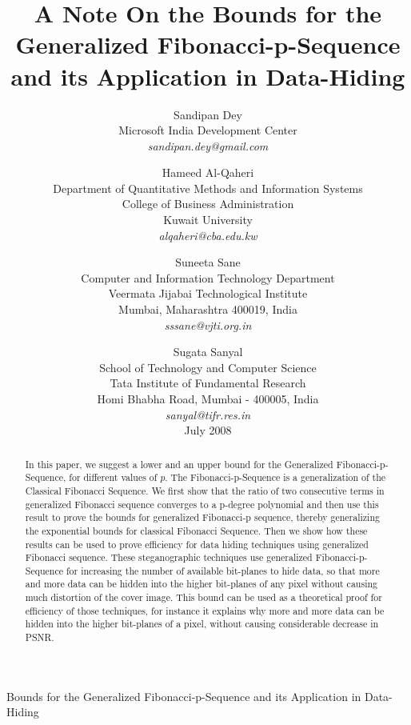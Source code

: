 \documentclass{ijcsa}
\begin{document}
\catchline{}{}{}{}{}

{Bounds for the Generalized Fibonacci-p-Sequence and its Application in Data-Hiding}

\title{A Note On the Bounds for the Generalized Fibonacci-p-Sequence and its Application in Data-Hiding}

\author{Sandipan Dey
\\Microsoft India Development Center
\\\emph{sandipan.dey@gmail.com}
}
\author{Hameed Al-Qaheri
\\Department of Quantitative Methods and Information Systems
\\College of Business Administration
\\Kuwait University
\\\emph{alqaheri@cba.edu.kw}
}
\author{Suneeta Sane
\\Computer and Information Technology Department
\\Veermata Jijabai Technological Institute
\\Mumbai, Maharashtra 400019, India
\\\emph{sssane@vjti.org.in}
}
\author{Sugata Sanyal
\\School of Technology and Computer Science
\\Tata Institute of Fundamental Research
\\Homi Bhabha Road, Mumbai - 400005, India
\\\emph{sanyal@tifr.res.in}
\\July 2008
}

\date{}

\maketitle

\begin{abstract}
\par In this paper, we suggest a lower and an upper bound for the Generalized Fibonacci-p-Sequence, 
for different values of $p$. The Fibonacci-p-Sequence is a generalization of
the Classical Fibonacci Sequence. We first show that the ratio of two consecutive terms in generalized 
Fibonacci sequence converges to a p-degree polynomial and then use this result to prove the  
bounds for generalized Fibonacci-p sequence, thereby generalizing the exponential bounds for 
classical Fibonacci Sequence. Then we show how these results can be used to prove efficiency for 
data hiding techniques using generalized Fibonacci sequence. These steganographic techniques 
use generalized Fibonacci-p-Sequence for increasing the number of available bit-planes to hide data, 
so that more and more data can be hidden into the higher bit-planes of any pixel without causing much 
distortion of the cover image. This bound can be used as a theoretical 
proof for efficiency of those techniques, for instance it explains why more and more data can be 
hidden into the higher bit-planes of a pixel, without causing considerable decrease in PSNR. 

\end{abstract}
\end{document}
